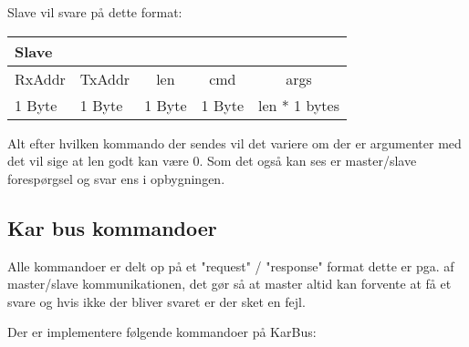 Slave vil svare på dette format:
\begin{table}[H]
\setlength{\parindent}{12pt}
\begin{tabular}{|l|l|c|c|c|}\hline
\multicolumn{5}{|l|}{Slave\cellcolor[gray]{0.7}}\\\hline
RxAddr & TxAddr & len & cmd & args  \\\hline
1 Byte & 1 Byte & 1 Byte & 1 Byte & len * 1 bytes \\\hline 
\end{tabular}
\end{table}

Alt efter hvilken kommando der sendes vil det variere om der er argumenter med det vil sige at len godt kan være 0. Som det også kan ses er master/slave forespørgsel og svar ens i opbygningen.

\subsection{Kar bus kommandoer}
Alle kommandoer er delt op på et "request" / "response" format dette er pga. af master/slave kommunikationen, det gør så at master altid kan forvente at få et svare og hvis ikke der bliver svaret er der sket en fejl.

Der er implementere følgende kommandoer på KarBus:

